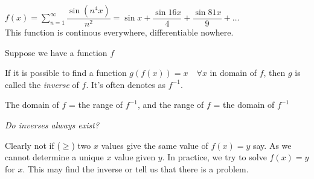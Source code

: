 \documentclass[twoside]{scrartcl}
\begin{document}
\begin{example} $f(x) = \displaystyle{\sum_{n=1}^{\infty} } \dfrac{\sin (n^4x)}{n^2} = \sin x + \dfrac{\sin 16x}{4} + \dfrac{\sin 81x}{9} + \dots$\\

This function is continous everywhere, differentiable nowhere.\\
\end{example}




 

Suppose we have a function $f$

\begin{center}
\end{center}


\begin{definition}
If it is possible to find a function $g(f(x)) = x \quad \forall x$ in domain of $f$, then $g$ is called the \emph{inverse} of $f$. It's often denotes as $f^{-1}$.
\end{definition}

The domain of $f$ = the range of $f^{-1}$, and the range of $f$ = the domain of $f^{-1}$

\textit{Do inverses always exist?} 

Clearly not if ($\geq$) two $x$ values give the same value of $f(x) = y$ say. As we cannot determine a unique $x$ value given $y$. In practice, we try to solve $f(x) = y$ for $x$. This may find the inverse or tell us that there is a problem.\\
\end{document}
